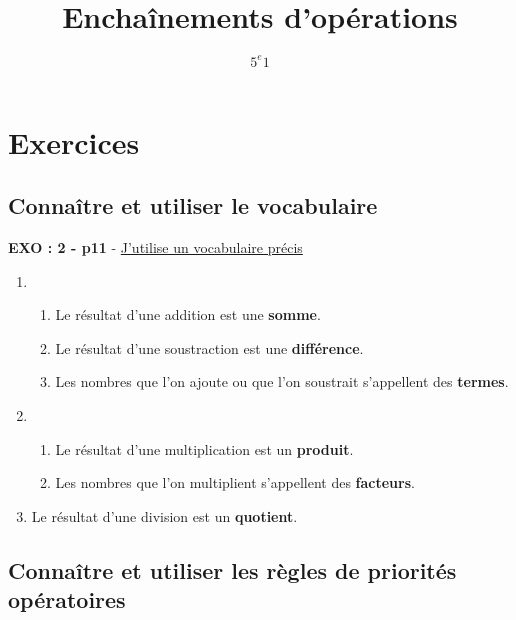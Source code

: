 \documentclass[11pt]{article}
\title{Enchaînements d'opérations} %
\author{$5^e 1$}
\begin{document}
\maketitle %


\section{Exercices}

\subsection{Connaître et utiliser le vocabulaire}

\textbf{EXO : 2 - p11} - \underline{J'utilise un vocabulaire précis}
\begin{enumerate}
\item
  \begin{enumerate}
  \item Le résultat d'une addition est une \textbf{somme}.
  \item Le résultat d'une soustraction est une \textbf{différence}.
  \item Les nombres que l'on ajoute ou que l'on soustrait s'appellent des \textbf{termes}.
  \end{enumerate}
\item
  \begin{enumerate}
  \item Le résultat d'une multiplication est un \textbf{produit}.
  \item Les nombres que l'on multiplient s'appellent des \textbf{facteurs}.
  \end{enumerate}

\item Le résultat d'une division est un \textbf{quotient}.
\end{enumerate}


\subsection{Connaître et utiliser les règles de priorités opératoires}
\end{document}
